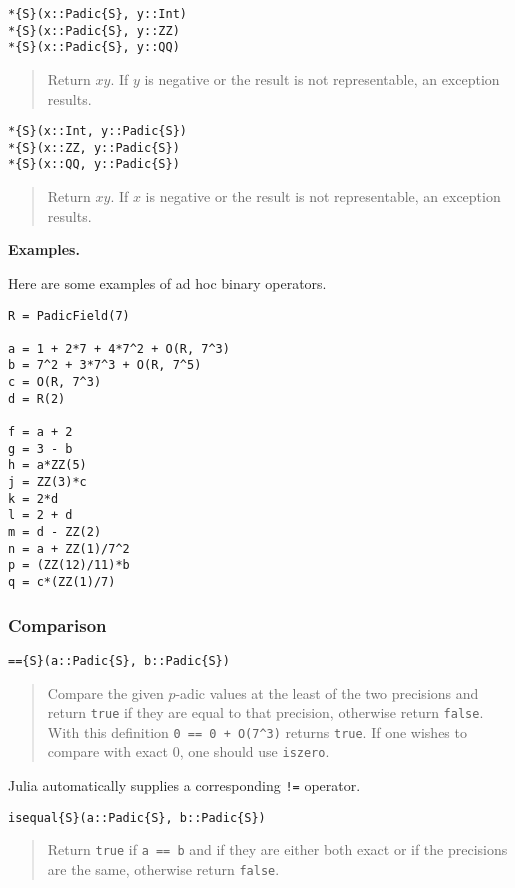 \documentclass[a4paper,10pt]{article}
\newcommand{\code}{\lstinline}
\newcommand{\desc}[1]{\vspace{-3mm}\begin{quote}#1\end{quote}}
\begin{document}
{{\begin{lstlisting}
*{S}(x::Padic{S}, y::Int)
*{S}(x::Padic{S}, y::ZZ)
*{S}(x::Padic{S}, y::QQ)
\end{lstlisting}

\desc{Return $xy$. If $y$ is negative or the result is not representable, an
exception results.}

\begin{lstlisting}
*{S}(x::Int, y::Padic{S})
*{S}(x::ZZ, y::Padic{S})
*{S}(x::QQ, y::Padic{S})
\end{lstlisting}

\desc{Return $xy$. If $x$ is negative or the result is not representable, an 
exception results.}

\textbf{Examples.}

Here are some examples of ad hoc binary operators.

\begin{lstlisting}
R = PadicField(7)

a = 1 + 2*7 + 4*7^2 + O(R, 7^3)
b = 7^2 + 3*7^3 + O(R, 7^5)
c = O(R, 7^3)
d = R(2)

f = a + 2
g = 3 - b
h = a*ZZ(5)
j = ZZ(3)*c
k = 2*d
l = 2 + d
m = d - ZZ(2)
n = a + ZZ(1)/7^2
p = (ZZ(12)/11)*b
q = c*(ZZ(1)/7)
\end{lstlisting}

\subsubsection{Comparison}

\begin{lstlisting}
=={S}(a::Padic{S}, b::Padic{S})
\end{lstlisting}

\desc{Compare the given $p$-adic values at the least of the two precisions and
return \code{true} if they are equal to that precision, otherwise return
\code{false}. With this definition \code{0 == 0 + O(7^3)} returns
\code{true}. If one wishes to compare with exact $0$, one should use
\code{iszero}.}

Julia automatically supplies a corresponding \code{!=} operator.

\begin{lstlisting}
isequal{S}(a::Padic{S}, b::Padic{S})
\end{lstlisting}

\desc{Return \code{true} if \code{a == b} and if they are either both exact or
if the precisions are the same, otherwise return \code{false}.}

}}
\end{document}
